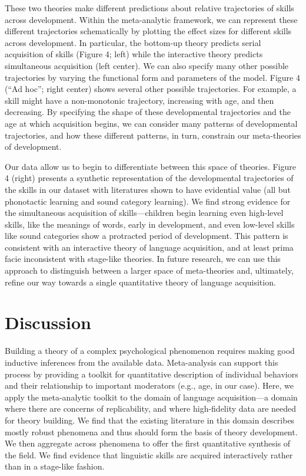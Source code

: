 \documentclass[9pt,twocolumn,twoside,lineno]{pnas-new}
\begin{document}
These two theories make different predictions about relative
trajectories of skills across development. Within the meta-analytic
framework, we can represent these different trajectories schematically
by plotting the effect sizes for different skills across development. In
particular, the bottom-up theory predicts serial acquisition of skills
(Figure 4; left) while the interactive theory predicts simultaneous
acquisition (left center). We can also specify many other possible
trajectories by varying the functional form and parameters of the model.
Figure 4 (\enquote{Ad hoc}; right center) shows several other possible
trajectories. For example, a skill might have a non-monotonic
trajectory, increasing with age, and then decreasing. By specifying the
shape of these developmental trajectories and the age at which
acquisition begins, we can consider many patterns of developmental
trajectories, and how these different patterns, in turn, constrain our
meta-theories of development.

Our data allow us to begin to differentiate between this space of
theories. Figure 4 (right) presents a synthetic representation of the
developmental trajectories of the skills in our dataset with literatures
shown to have evidential value (all but phonotactic learning and sound
category learning). We find strong evidence for the simultaneous
acquisition of skills---children begin learning even high-level skills,
like the meanings of words, early in development, and even low-level
skills like sound categories show a protracted period of development.
This pattern is consistent with an interactive theory of language
acquisition, and at least prima facie inconsistent with stage-like
theories. In future research, we can use this approach to distinguish
between a larger space of meta-theories and, ultimately, refine our way
towards a single quantitative theory of language acquisition.

\section*{Discussion}\label{discussion}

Building a theory of a complex psychological phenomenon requires making
good inductive inferences from the available data. Meta-analysis can
support this process by providing a toolkit for quantitative description
of individual behaviors and their relationship to important moderators
(e.g., age, in our case). Here, we apply the meta-analytic toolkit to
the domain of language acquisition---a domain where there are concerns
of replicability, and where high-fidelity data are needed for theory
building. We find that the existing literature in this domain describes
mostly robust phenomena and thus should form the basis of theory
development. We then aggregate across phenomena to offer the first
quantitative synthesis of the field. We find evidence that linguistic
skills are acquired interactively rather than in a stage-like fashion.
\end{document}
